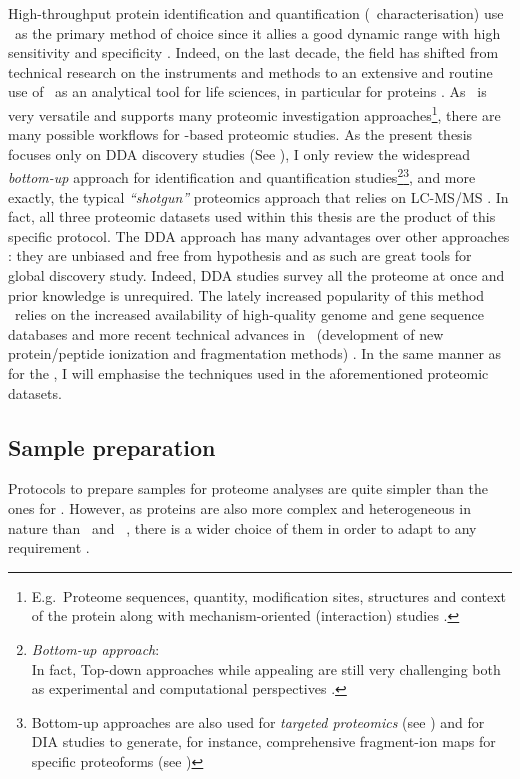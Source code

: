 High-throughput protein identification and quantification (\ie\ characterisation)
use \ms\ as the primary method of choice since it allies a good dynamic range
with high sensitivity and specificity .
Indeed, on the last decade, the field has shifted from technical research on the
instruments and methods to an extensive and routine use of \ms\ as an analytical
tool for life sciences, in particular for proteins .
As \ms\ is very versatile and supports many proteomic investigation
approaches\footnote{E.g.\ Proteome sequences, quantity, modification sites,
structures and context of the protein along with mechanism-oriented
(interaction) studies .},
there are many possible workflows for \ms-based proteomic studies.
As the present thesis focuses only on \gls{DDA} discovery
studies (See ), I only review the widespread
\emph{bottom-up} approach for identification and quantification
studies\footnote{\emph{Bottom-up approach}: \\
In fact, \gls{Top-down} approaches while appealing
are still very challenging both as experimental and computational perspectives
.}\sepfootnote\footnote{Bottom-up approaches are
also used for \emph{targeted proteomics} (see ) and for
\gls{DIA} studies to generate, for instance, comprehensive fragment-ion maps for
specific proteoforms (see )}, and more exactly, the
typical \emph{\enquote{shotgun}} proteomics approach that
relies on \gls{LC-MS/MS} . In fact, all
three proteomic datasets used within this thesis are the product of this specific
protocol. The \gls{DDA} approach has many advantages over other approaches
: they are unbiased and free from hypothesis and as
such are great tools for global discovery study. Indeed, \gls{DDA} studies survey
all the proteome at once and prior knowledge is unrequired. The lately increased
popularity of this method%
~relies on the increased availability of high-quality genome and gene sequence
databases and more recent technical advances in \ms\ (development of new
protein/peptide ionization and fragmentation methods)
. In the same manner as for the \Rnaseq,
I will emphasise the techniques used in the aforementioned proteomic datasets.

\subsection{Sample preparation}
Protocols to prepare samples for proteome analyses are quite simpler than the
ones for \Rnaseq. However, as proteins are also more complex and heterogeneous in
nature than \DNA\ and \RNA\ , there is a wider choice of them
in order to adapt to any requirement .

